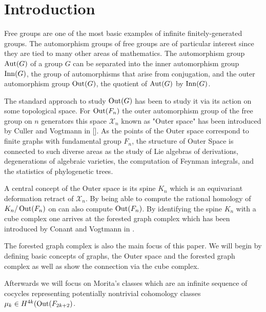 %

\usepackage{todonotes}
\usepackage{./tikzit/tikzit}
\usepackage{biblatex}


\usepackage[stable]{footmisc}

	

\section{Introduction\footnotemark}
Free groups are one of the most basic examples of infinite finitely-generated groups.
The automorphism groups of free groups are of particular interest since they are tied to many other areas of mathematics.
The automorphism group $\operatorname{Aut}(G)$ of a group $G$ can be separated into the inner automorphism group $\operatorname{Inn}(G)$,
the group of automorphisms that arise from conjugation, and the outer automorphism group $\operatorname{Out}(G)$, the quotient of  $\operatorname{Aut}(G)$ by $\operatorname{Inn}(G)$.

The standard approach to study $\operatorname{Out}(G)$ has been to study it via its action on some topological space.
For $\operatorname{Out}(F_{n})$ the outer automorphism group of the free group on $n$ generators this space $\mathcal{X}_{n}$ known as "Outer space"
has been introduced by Culler and Vogtmann in []. As the points of the Outer space correspond to finite graphs with fundamental group $F_{n}$,
the structure of Outer Space is connected to such diverse areas as the study of Lie algebras of derivations, degenerations of algebraic varieties,
the computation of Feynman integrals, and the statistics of phylogenetic trees.

A central concept of the Outer space is its spine $K_{n}$ which is an equivariant deformation retract of $\mathcal{X}_{n}$.
By being able to compute the rational homology of $K_{n} / \operatorname{Out}(F_{n})$ on can also compute $\operatorname{Out}(F_{n})$.
By identifying the spine $K_{n}$ with a cube complex one arrives at the forested graph complex
which has been introduced by Conant and Vogtmann in \cite{conant03}.

The forested graph complex is also the main focus of this paper.
We will begin by defining basic concepts of graphs, the Outer space and the forested graph complex as well as show the connection via the cube complex.

Afterwards we will focus on Morita's classes which are an infinite sequence of cocycles representing potentially nontrivial cohomology classes $\mu_{k} \in H^{4k}(\operatorname{Out}(F_{2k+2})$.




